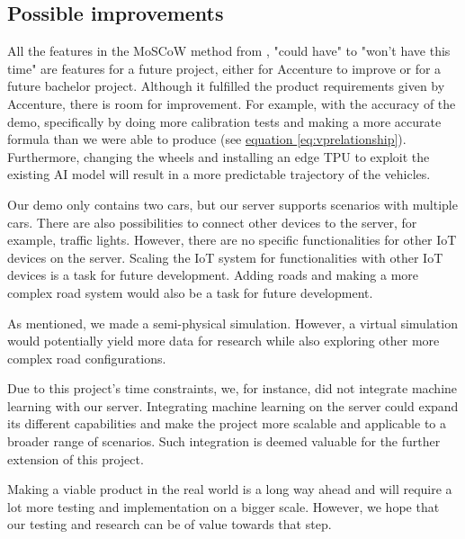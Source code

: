 \subsection{Possible improvements}
All the features in the MoSCoW method from , "could have" to "won't have this time" are features for a future project, either for Accenture to improve or for a future bachelor project. Although it fulfilled the product requirements given by Accenture, there is room for improvement. For example, with the accuracy of the demo, specifically by doing more calibration tests and making a more accurate formula than we were able to produce (see \hyperref[eq:vprelationship]{equation \eqref{eq:vprelationship}}). Furthermore, changing the wheels and installing an edge TPU to exploit the existing AI model will result in a more predictable trajectory of the vehicles.

Our demo only contains two cars, but our server supports scenarios with multiple cars. There are also possibilities to connect other devices to the server, for example, traffic lights. However, there are no specific functionalities for other IoT devices on the server. Scaling the IoT system for functionalities with other IoT devices is a task for future development. Adding roads and making a more complex road system would also be a task for future development.

As mentioned, we made a semi-physical simulation. However, a virtual simulation would potentially yield more data for research while also exploring other more complex road configurations.

Due to this project's time constraints, we, for instance, did not integrate machine learning with our server. Integrating machine learning on the server could expand its different capabilities and make the project more scalable and applicable to a broader range of scenarios. Such integration is deemed valuable for the further extension of this project.

Making a viable product in the real world is a long way ahead and will require a lot more testing and implementation on a bigger scale. However, we hope that our testing and research can be of value towards that step.